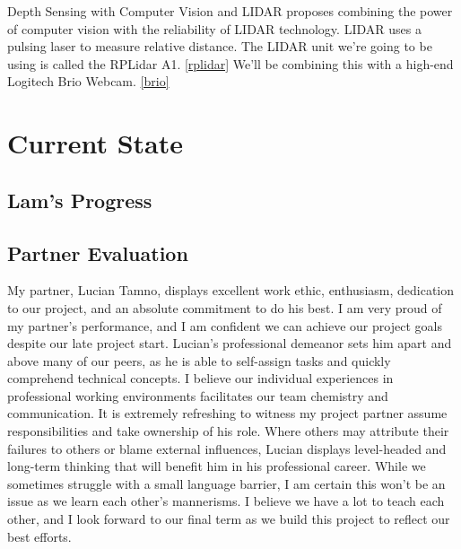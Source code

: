 \documentclass[onecolumn, draftclsnofoot,10pt, compsoc]{IEEEtran}
\begin{document}
\begin{singlespace}
		Depth Sensing with Computer Vision and LIDAR proposes combining the power of computer vision with the reliability of LIDAR technology.
		LIDAR uses a pulsing laser to measure relative distance.
		The LIDAR unit we're going to be using is called the RPLidar A1. \ref{rplidar}
		We'll be combining this with a high-end Logitech Brio Webcam. \ref{brio}

	\section{Current State}

	\subsection{Lam's Progress}
	
	\subsection{Partner Evaluation}
		My partner, Lucian Tamno, displays excellent work ethic, enthusiasm, dedication to our project, and an absolute commitment to do his best.
		I am very proud of my partner's performance, and I am confident we can achieve our project goals despite our late project start.
		Lucian's professional demeanor sets him apart and above many of our peers, as he is able to self-assign tasks and quickly comprehend technical concepts.
		I believe our individual experiences in professional working environments facilitates our team chemistry and communication.
		It is extremely refreshing to witness my project partner assume responsibilities and take ownership of his role.
		Where others may attribute their failures to others or blame external influences, Lucian displays level-headed and long-term thinking that will benefit him in his professional career.
		While we sometimes struggle with a small language barrier, I am certain this won't be an issue as we learn each other's mannerisms.
		I believe we have a lot to teach each other, and I look forward to our final term as we build this project to reflect our best efforts.
		
\end{singlespace}
\end{document}
